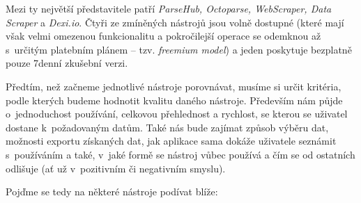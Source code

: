 \documentclass[thesis=B,czech]{FITthesis}[2012/06/26]
\begin{document}
Mezi ty největší představitele patří \emph{ParseHub, Octoparse, WebScraper, Data Scraper} a \emph{Dexi.io}. Čtyři ze zmíněných nástrojů jsou volně dostupné (které mají však velmi omezenou funkcionalitu a pokročilejší operace se odemknou až s~určitým platebním plánem -- tzv. \emph{freemium model}) a jeden poskytuje bezplatně pouze 7denní zkušební verzi.

Předtím, než začneme jednotlivé nástroje porovnávat, musíme si určit kritéria, podle kterých budeme hodnotit kvalitu daného nástroje. Především nám půjde o~jednoduchost používání, celkovou přehlednost a rychlost, se kterou se uživatel dostane k~požadovaným datům. Také nás bude zajímat způsob výběru dat, možnosti exportu získaných dat, jak aplikace sama dokáže uživatele seznámit s~používáním a také, v~jaké formě se nástroj vůbec používá a čím se od ostatních odlišuje (ať už v~pozitivním či negativním smyslu). 

Poj\v{d}me se tedy na některé nástroje podívat blíže:
\end{document}
